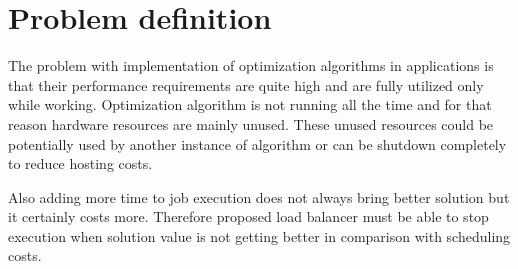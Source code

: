 
\chapter{Problem definition}\label{ch:problem-definition}

The problem with implementation of optimization algorithms in applications is that their
performance requirements are quite high and are fully utilized only while working.
Optimization algorithm is not running all the time and for that reason hardware resources are mainly unused.
These unused resources could be potentially used by another instance of algorithm
or can be shutdown completely to reduce hosting costs.

Also adding more time to job execution does not always bring better solution
but it certainly costs more.
Therefore proposed load balancer must be able to stop execution when solution value
is not getting better in comparison with scheduling costs.



%